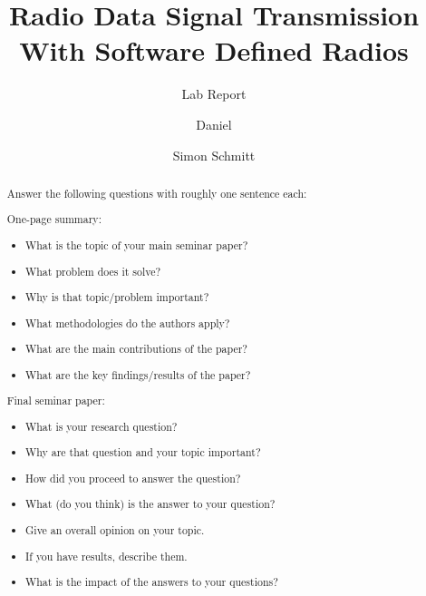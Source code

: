 \documentclass[sigconf]{acmart}
\begin{document}
\title{Radio Data Signal Transmission With Software Defined Radios}

\subtitle{Lab Report}



\author{Daniel }
\author{Simon Schmitt}

\renewcommand{\shortauthors}{Y. Name et al.}


\begin{abstract}
  Answer the following questions with roughly one sentence each:

  One-page summary:
  \begin{itemize}
  \item What is the topic of your main seminar paper?
  \item What problem does it solve?
  \item Why is that topic/problem important?
  \item What methodologies do the authors apply?
  \item What are the main contributions of the paper?
  \item What are the key findings/results of the paper?
  \end{itemize}
  
  Final seminar paper:
  \begin{itemize}
  \item What is your research question?
  \item Why are that question and your topic important?
  \item How did you proceed to answer the question?
  \item What (do you think) is the answer to your question?
  \item Give an overall opinion on your topic.
  \item If you have results, describe them.
  \item What is the impact of the answers to your questions?
  \end{itemize}

\end{abstract}
\end{document}
